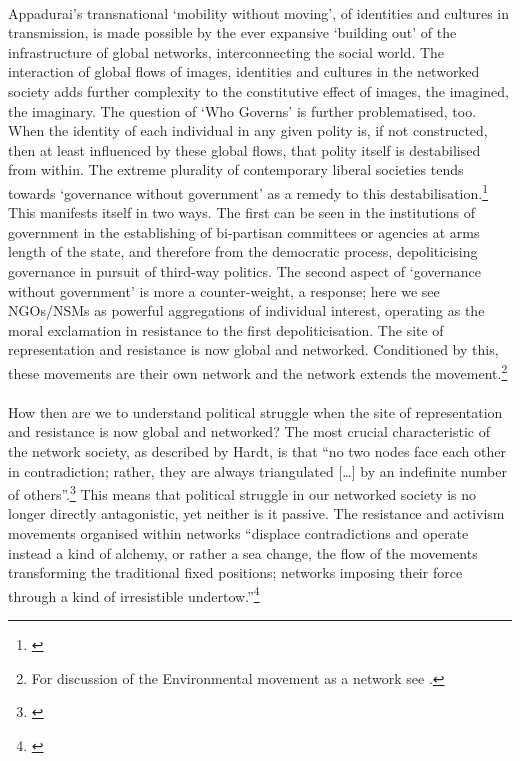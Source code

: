 \documentclass[11pt,titlepage]{book}
\begin{document}
\paragraph{}Appadurai's transnational `mobility without moving', of identities and cultures in transmission, is made possible by the ever expansive `building out' of the infrastructure of global networks, interconnecting the social world. The interaction of global flows of images, identities and cultures in the networked society adds further complexity to the constitutive effect of images, the imagined, the imaginary. The question of `Who Governs' is further problematised, too. When the identity of each individual in any given polity is, if not constructed, then at least influenced by these global flows, that polity itself is destabilised from within. The extreme plurality of contemporary liberal societies tends towards `governance without government' as a remedy to this destabilisation.\footnote{\cite[pp. 13-14]{Hardt:2001jl}} This manifests itself in two ways. The first can be seen in the institutions of government in the establishing of bi-partisan committees or agencies at arms length of the state, and therefore from the democratic process, depoliticising governance in pursuit of third-way politics. The second aspect of `governance without government' is more a counter-weight, a response; here we see NGOs/NSMs as powerful aggregations of individual interest, operating as the moral exclamation in resistance to the first depoliticisation. The site of representation and resistance is now global and networked. Conditioned by this, these movements are their own network and the network extends the movement.\footnote{For discussion of the Environmental movement as a network see \cite{rosenblatt:2004mn}.}

\paragraph{}How then are we to understand political struggle when the site of representation and resistance is now global and networked? The most crucial characteristic of the network society, as described by Hardt, is that ``no two nodes face each other in contradiction; rather, they are always triangulated [\ldots] by an indefinite number of others''.\footnote{\cite[p. 117]{Hardt:2002}} This means that political struggle in our networked society is no longer directly antagonistic, yet neither is it passive. The resistance and activism movements organised within networks ``displace contradictions and operate instead a kind of alchemy, or rather a sea change, the flow of the movements transforming the traditional fixed positions; networks imposing their force through a kind of irresistible undertow.''\footnote{\cite[p. 117]{Hardt:2002}}
\end{document}
